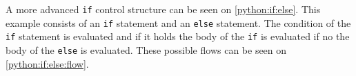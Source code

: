 A more advanced \texttt{if} control structure can be seen on \cref{python:if:else}.
This example consists of an \texttt{if} statement and an \texttt{else} statement.
The condition of the \texttt{if} statement is evaluated and if it holds the body of the \texttt{if} is evaluated if no the body of the \texttt{else} is evaluated.
These possible flows can be seen on \cref{python:if:else:flow}.


